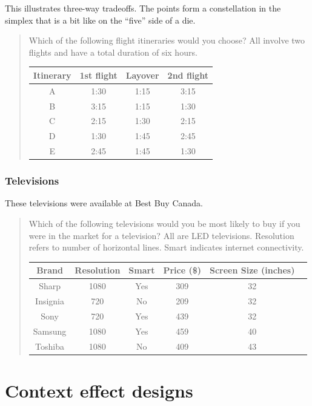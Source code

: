 \documentclass[11pt,letter]{amsart}
\begin{document}
This illustrates three-way tradeoffs. The points form a constellation in the
simplex that is a bit like on the ``five'' side of a die.

\begin{quotation}
Which of the following flight itineraries would you choose? All involve two
flights and have a total duration of six hours.

\begin{tabular}{cccc}
\hline
Itinerary & 1st flight & Layover & 2nd flight \\ \hline
A & 1:30 & 1:15 & 3:15 \\ 
B & 3:15 & 1:15 & 1:30 \\ 
C & 2:15 & 1:30 & 2:15 \\ 
D & 1:30 & 1:45 & 2:45 \\ 
E & 2:45 & 1:45 & 1:30 \\ \hline
\end{tabular}
\end{quotation}

\subsubsection{Televisions}

These televisions were available at Best Buy Canada.

\begin{quotation}
Which of the following televisions would you be most likely to buy if you
were in the market for a television? All are LED televisions. Resolution
refers to number of horizontal lines. Smart indicates internet connectivity.

\begin{tabular}{cccccc}
\hline
Brand & Resolution & Smart & Price (\$) & Screen Size (inches) &  \\ \hline
Sharp & 1080 & Yes & 309 & 32 &  \\ 
Insignia & 720 & No & 209 & 32 &  \\ 
Sony & 720 & Yes & 439 & 32 &  \\ 
Samsung & 1080 & Yes & 459 & 40 &  \\ 
Toshiba & 1080 & No & 409 & 43 &  \\ \hline
\end{tabular}
\end{quotation}

\appendix

\pagebreak

\section{Context effect designs}
\end{document}
